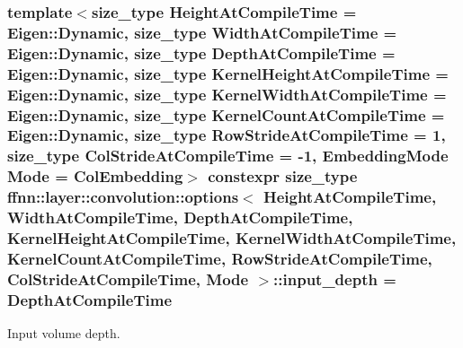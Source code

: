 \hypertarget{structffnn_1_1layer_1_1convolution_1_1options_a5c928d8733be98927ccd22d009739deb}{
\subsubsection[{input\-\_\-depth}]{\setlength{\rightskip}{0pt plus 5cm}template$<$size\-\_\-type Height\-At\-Compile\-Time = Eigen\-::\-Dynamic, size\-\_\-type Width\-At\-Compile\-Time = Eigen\-::\-Dynamic, size\-\_\-type Depth\-At\-Compile\-Time = Eigen\-::\-Dynamic, size\-\_\-type Kernel\-Height\-At\-Compile\-Time = Eigen\-::\-Dynamic, size\-\_\-type Kernel\-Width\-At\-Compile\-Time = Eigen\-::\-Dynamic, size\-\_\-type Kernel\-Count\-At\-Compile\-Time = Eigen\-::\-Dynamic, size\-\_\-type Row\-Stride\-At\-Compile\-Time = 1, size\-\_\-type Col\-Stride\-At\-Compile\-Time = -\/1, Embedding\-Mode Mode = Col\-Embedding$>$ constexpr {\bf size\-\_\-type} {\bf ffnn\-::layer\-::convolution\-::options}$<$ Height\-At\-Compile\-Time, Width\-At\-Compile\-Time, Depth\-At\-Compile\-Time, Kernel\-Height\-At\-Compile\-Time, Kernel\-Width\-At\-Compile\-Time, Kernel\-Count\-At\-Compile\-Time, Row\-Stride\-At\-Compile\-Time, Col\-Stride\-At\-Compile\-Time, Mode $>$\-::input\-\_\-depth = Depth\-At\-Compile\-Time\hspace{0.3cm}{\ttfamily [static]}}}\label{structffnn_1_1layer_1_1convolution_1_1options_a5c928d8733be98927ccd22d009739deb}


Input volume depth. 

